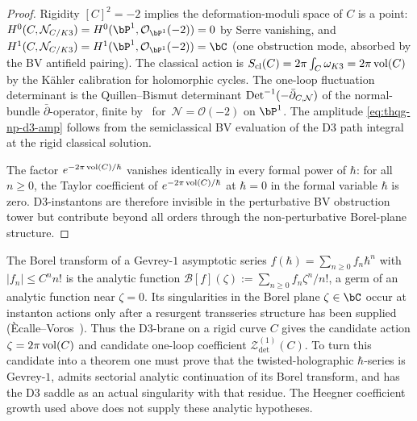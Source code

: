\begin{proof}
Rigidity $[C]^2 = -2$ implies the deformation-moduli space of $C$ is
a point: $H^0(C,\mathcal{N}_{C/K3}) =
H^0(\bP^1,\mathcal{O}_{\bP^1}(-2)) = 0$ by Serre vanishing, and
$H^1(C,\mathcal{N}_{C/K3}) =
H^1(\bP^1,\mathcal{O}_{\bP^1}(-2)) = \bC$ (one obstruction mode,
absorbed by the BV antifield pairing). The classical action is
$S_{\mathrm{cl}}(C) = 2\pi\int_C\omega_{K3} = 2\pi\operatorname{vol}(C)$ by the
K\"ahler calibration for holomorphic cycles. The one-loop fluctuation
determinant is the Quillen--Bismut determinant
$\operatorname{Det}^{-1}(-\bar\partial_{C,\mathcal{N}})$ of the normal-bundle
$\bar\partial$-operator, finite by~\cite[Thm.~7.1]{BismutGilletSoule1988}
for~$\mathcal{N} = \mathcal{O}(-2)$ on $\bP^1$. The amplitude
\eqref{eq:thqg-np-d3-amp} follows from the semiclassical BV
evaluation of the D$3$ path integral at the rigid classical solution.

The factor $e^{-2\pi\operatorname{vol}(C)/\hbar}$ vanishes identically in every
formal power of $\hbar$: for all $n\geq 0$, the Taylor coefficient of
$e^{-2\pi\operatorname{vol}(C)/\hbar}$ at $\hbar = 0$ in the formal variable
$\hbar$ is zero. D$3$-instantons are therefore invisible in the
perturbative BV obstruction tower but contribute beyond all orders
through the non-perturbative Borel-plane structure.
\end{proof}

\begin{remark}
\label{rem:thqg-np-d3-borel-plane}
The Borel transform of a Gevrey-$1$ asymptotic series
$f(\hbar) = \sum_{n\geq 0}f_n\hbar^n$ with $|f_n|\leq C^n n!$ is the
analytic function $\mathcal{B}[f](\zeta) := \sum_{n\geq 0}f_n\zeta^n/n!$,
a germ of an analytic function near $\zeta = 0$. Its singularities
in the Borel plane $\zeta\in\bC$ occur at instanton actions only
after a resurgent transseries structure has been supplied
(\`Ecalle--Voros~\cite{EcalleVoros1981}). Thus the D$3$-brane on a
rigid curve $C$ gives the candidate action
$\zeta = 2\pi\operatorname{vol}(C)$ and candidate one-loop coefficient
$\mathcal{Z}^{(1)}_{\det}(C)$. To turn this candidate into a theorem
one must prove that the twisted-holographic $\hbar$-series is
Gevrey-$1$, admits sectorial analytic continuation of its Borel
transform, and has the D$3$ saddle as an actual singularity with that
residue. The Heegner coefficient growth used above does not supply
these analytic hypotheses.
\end{remark}

